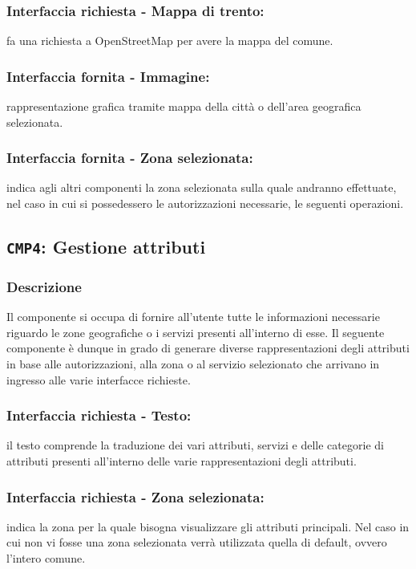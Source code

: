         \subsubsection{Interfaccia richiesta - Mappa di trento:}
            fa una richiesta a OpenStreetMap per avere la mappa del comune.
        \subsubsection{Interfaccia fornita - Immagine:}
            rappresentazione grafica tramite mappa della città o dell'area geografica selezionata.
        \subsubsection{Interfaccia fornita - Zona selezionata:}
            indica agli altri componenti la zona selezionata sulla quale andranno effettuate, nel caso in cui si possedessero le autorizzazioni necessarie, le seguenti operazioni.
    
    \subsection{\texttt{CMP4}: Gestione attributi}
        \subsubsection{Descrizione}
            Il componente si occupa di fornire all'utente tutte le informazioni necessarie riguardo le zone geografiche o i servizi presenti all'interno di esse. Il seguente componente è dunque in grado di generare diverse rappresentazioni degli attributi in base alle autorizzazioni, alla zona o al servizio selezionato che arrivano in ingresso alle varie interfacce richieste.
        \subsubsection{Interfaccia richiesta - Testo:}
            il testo comprende la traduzione dei vari attributi, servizi e delle categorie di attributi presenti all'interno delle varie rappresentazioni degli attributi.
        \subsubsection{Interfaccia richiesta - Zona selezionata:}
            indica la zona per la quale bisogna visualizzare gli attributi principali. Nel caso in cui non vi fosse una zona selezionata verrà utilizzata quella di default, ovvero l'intero comune.
